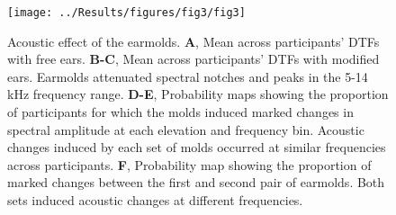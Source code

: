\begin{figure}[h]
\centering
	\centerline{\texttt{[image: ../Results/figures/fig3/fig3]}}
	\caption{Acoustic effect of the earmolds. \textbf{A}, Mean across participants' DTFs with free ears. \textbf{B-C}, Mean across participants' DTFs with modified ears. Earmolds attenuated spectral notches and peaks in the 5-14 kHz frequency range. \textbf{D-E}, Probability maps showing the proportion of participants for which the molds induced marked changes in spectral amplitude at each elevation and frequency bin. Acoustic changes induced by each set of molds occurred at similar frequencies across participants. \textbf{F}, Probability map showing the proportion of marked changes between the first and second pair of earmolds. Both sets induced acoustic changes at different frequencies.}
        \label{fig:spectral_change}
\end{figure}

